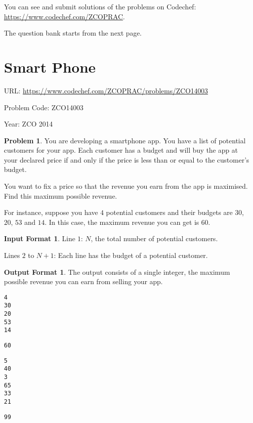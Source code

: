 \documentclass[twoside,12pt,a4paper,english]{book}
\theoremstyle{definition}
\theoremstyle{problemstyle}
\newtheorem*{problem}{Problem} %
\theoremstyle{problemstyle}
\newtheorem*{input_st}{Input Format} %
\theoremstyle{problemstyle}
\newtheorem*{output_st}{Output Format} %
\begin{document}
You can see and submit solutions of the problems on Codechef: \url{https://www.codechef.com/ZCOPRAC}. 

The question bank starts from the next page.

\newpage

\section{Smart Phone}

URL: \url{https://www.codechef.com/ZCOPRAC/problems/ZCO14003}

Problem Code: ZCO14003

Year: ZCO 2014

\begin{problem}
You are developing a smartphone app. You have a list of potential customers for your app. Each customer has a budget and will buy the app at your declared price if and only if the price is less than or equal to the customer's budget.

You want to fix a price so that the revenue you earn from the app is maximised. Find this maximum possible revenue.

For instance, suppose you have $4$ potential customers and their budgets are $30$, $20$, $53$ and $14$. In this case, the maximum revenue you can get is 60.
\end{problem}


\begin{input_st}
Line $1$: $N$, the total number of potential customers.

Lines $2$ to $N+1$: Each line has the budget of a potential customer.
\end{input_st}

\begin{output_st}
The output consists of a single integer, the maximum possible revenue you can earn from selling your app.
\end{output_st}

\begin{tcolorbox}[title=Example]
\begin{lstlisting}
4
30
20
53
14
\end{lstlisting}
\tcblower
\begin{lstlisting}
60
\end{lstlisting}
\end{tcolorbox}

\begin{tcolorbox}[title=Example]
\begin{lstlisting}
5
40
3
65
33
21
\end{lstlisting}
\tcblower
\begin{lstlisting}
99
\end{lstlisting}
\end{tcolorbox}
\end{document}
